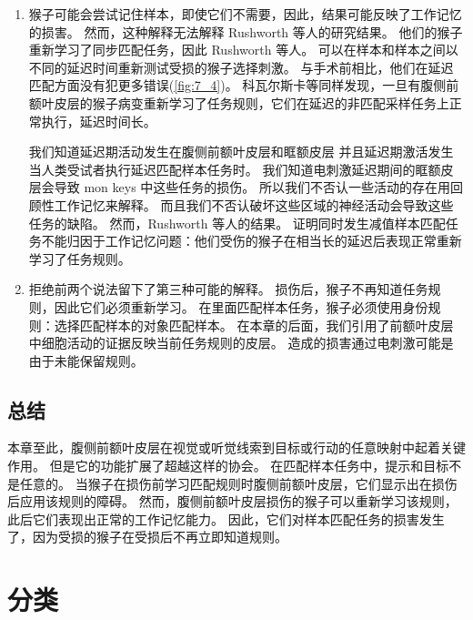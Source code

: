 \begin{enumerate}
\item 猴子可能会尝试记住样本，即使它们不需要，因此，结果可能反映了工作记忆的损害。
然而，这种解释无法解释 Rushworth 等人的研究结果。 
他们的猴子重新学习了同步匹配任务，因此 Rushworth 等人。
可以在样本和样本之间以不同的延迟时间重新测试受损的猴子选择刺激。 
与手术前相比，他们在延迟匹配方面没有犯更多错误(\ref{fig:7_4})。 
科瓦尔斯卡等\cite{kowalska1991role}同样发现，一旦有腹侧前额叶皮层的猴子病变重新学习了任务规则，它们在延迟的非匹配采样任务上正常执行，延迟时间长。
\par


我们知道延迟期活动发生在腹侧前额叶皮层和眶额皮层\cite{rosenkilde1981single,hoshi2000neuronal} 并且延迟期激活发生当人类受试者执行延迟匹配样本任务时\cite{rama2005functional,schon2008delayed}。
我们知道电刺激延迟期间的眶额皮层会导致 mon keys 中这些任务的损伤\cite{sobotka2005can}。
所以我们不否认一些活动的存在用回顾性工作记忆来解释。 
而且我们不否认破坏这些区域的神经活动会导致这些任务的缺陷。 
然而，Rushworth 等人的结果。 
证明同时发生减值样本匹配任务不能归因于工作记忆问题：他们受伤的猴子在相当长的延迟后表现正常重新学习了任务规则。
\item 拒绝前两个说法留下了第三种可能的解释。 
损伤后，猴子不再知道任务规则，因此它们必须重新学习。 
在里面匹配样本任务，猴子必须使用身份规则：选择匹配样本的对象匹配样本。 
在本章的后面，我们引用了前额叶皮层中细胞活动的证据反映当前任务规则的皮层\cite{wallis2001single}。
造成的损害通过电刺激\cite{sobotka2005can}可能是由于未能保留规则。
\end{enumerate}



\subsection{总结}
\par 

本章至此，腹侧前额叶皮层在视觉或听觉线索到目标或行动的任意映射中起着关键作用。 
但是它的功能扩展了超越这样的协会。 
在匹配样本任务中，提示和目标不是任意的。 
当猴子在损伤前学习匹配规则时腹侧前额叶皮层，它们显示出在损伤后应用该规则的障碍。
然而，腹侧前额叶皮层损伤的猴子可以重新学习该规则，此后它们表现出正常的工作记忆能力。 
因此，它们对样本匹配任务的损害发生了，因为受损的猴子在受损后不再立即知道规则。



\section{分类}
\par

